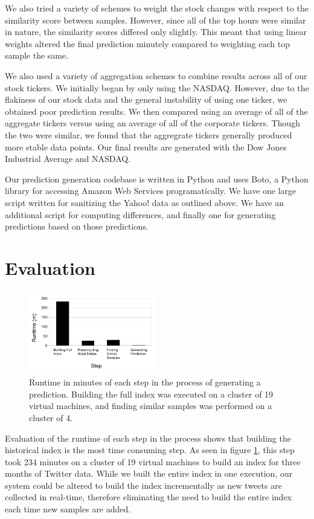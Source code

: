 \documentclass[twocolumn]{article}
\begin{document}
We also tried a variety of schemes to weight the stock changes with respect to the similarity score between samples. However, since all of the top hours were similar in nature, the similarity scores differed only slightly. This meant that using linear weights altered the final prediction minutely compared to weighting each top sample the same. 

We also used a variety of aggregation schemes to combine results across all of our stock tickers. We initially began by only using the NASDAQ. However, due to the flakiness of our stock data and the general instability of using one ticker, we obtained poor prediction results. We then compared using an average of all of the aggregate tickers versus using an average of all of the corporate tickers. Though the two were similar, we found that the aggregrate tickers generally produced more stable data points. Our final results are generated with the Dow Jones Industrial Average and NASDAQ.

Our prediction generation codebase is written in Python and uses Boto, a Python library for accessing Amazon Web Services programatically. We have one large script written for sanitizing the Yahoo! data as outlined above. We have an additional script for computing differences, and finally one for generating predictions based on those predictions. 

\section{Evaluation}

\begin{figure}
\centering
\includegraphics[width=0.5\textwidth]{runtime}
\caption{Runtime in minutes of each step in the process of generating a prediction. Building the full index was executed on a cluster of 19 virtual machines, and finding similar samples was performed on a cluster of 4.}
\label{runtime}
\end{figure}

Evaluation of the runtime of each step in the process shows that building the historical index is the most time consuming step. As seen in figure \ref{runtime}, this step took 234 minutes on a cluster of 19 virtual machines to build an index for three months of Twitter data. While we built the entire index in one execution, our system could be altered to build the index incrementally as new tweets are collected in real-time, therefore eliminating the need to build the entire index each time new samples are added.
\end{document}
